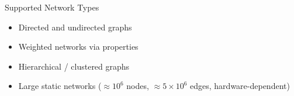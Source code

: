 \begin{frame}{Supported Network Types}
	\begin{itemize}
		\item Directed and undirected graphs
		\item Weighted networks via properties
		\item Hierarchical / clustered graphs
		\item Large static networks ($\approx 10^6$ nodes, $\approx 5\times10^6$ edges, hardware-dependent)
	\end{itemize}
\end{frame}